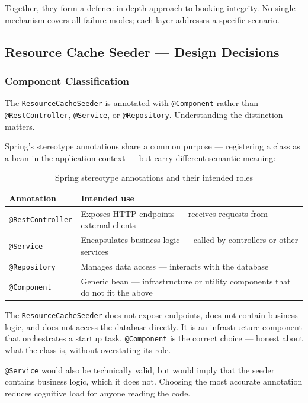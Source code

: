 Together, they form a defence-in-depth approach to booking integrity. No single mechanism covers all failure modes; each layer addresses a specific scenario.

\subsection{Resource Cache Seeder — Design Decisions}

\subsubsection{Component Classification}

The \texttt{ResourceCacheSeeder} is annotated with \texttt{@Component} rather than \texttt{@RestController}, \texttt{@Service}, or \texttt{@Repository}. Understanding the distinction matters.

Spring's stereotype annotations share a common purpose --- registering a class as a bean in the application context --- but carry different semantic meaning:

\begin{table}[H]
\centering
\begin{tabular}{lp{9cm}}
\toprule
\textbf{Annotation} & \textbf{Intended use} \\
\midrule
\texttt{@RestController} & Exposes HTTP endpoints --- receives requests from external clients \\
\texttt{@Service} & Encapsulates business logic --- called by controllers or other services \\
\texttt{@Repository} & Manages data access --- interacts with the database \\
\texttt{@Component} & Generic bean --- infrastructure or utility components that do not fit the above \\
\bottomrule
\end{tabular}
\caption{Spring stereotype annotations and their intended roles}
\end{table}

The \texttt{ResourceCacheSeeder} does not expose endpoints, does not contain business logic, and does not access the database directly. It is an infrastructure component that orchestrates a startup task. \texttt{@Component} is the correct choice --- honest about what the class is, without overstating its role.

\texttt{@Service} would also be technically valid, but would imply that the seeder contains business logic, which it does not. Choosing the most accurate annotation reduces cognitive load for anyone reading the code.

